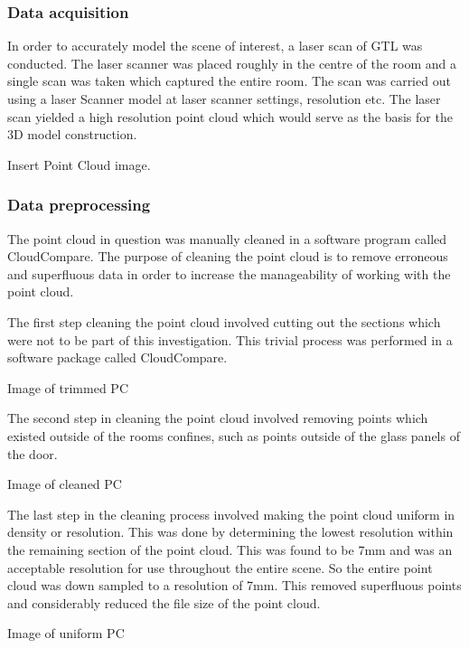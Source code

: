 \documentclass[11pt,a4paper]{report}
\begin{document}
			\subsubsection{Data acquisition}
				In order to accurately model the scene of interest, a laser scan of GTL was conducted. The laser scanner was placed roughly in the centre of the room and a single scan was taken which captured the entire room. The scan was carried out using a {{laser Scanner model}} at {{laser scanner settings, resolution etc}}. The laser scan yielded a high resolution point cloud which would serve as the basis for the 3D model construction.
				
				{{Insert Point Cloud image}}.
				
			\subsubsection{Data preprocessing}
				The point cloud in question was manually cleaned in a software program called CloudCompare. The purpose of cleaning the point cloud is to remove erroneous and superfluous data in order to increase the manageability of working with the point cloud.
	
				The first step cleaning the point cloud involved cutting out the sections which were not to be part of this investigation. This trivial process was performed in a software package called CloudCompare.
				
				{{Image of trimmed PC}}
				
				The second step in cleaning the point cloud involved removing points which existed outside of the rooms confines, such as points outside of the glass panels of the door.
				
				{{Image of cleaned PC}}
 
				The last step in the cleaning process involved making the point cloud uniform in density or resolution. This was done by determining the lowest resolution within the remaining section of the point cloud. This was found to be 7mm and was an acceptable resolution for use throughout the entire scene. So the entire point cloud was down sampled to a resolution of 7mm. This removed superfluous points and considerably reduced the file size of the point cloud.
				
				{{Image of uniform PC}}
			
\end{document}
